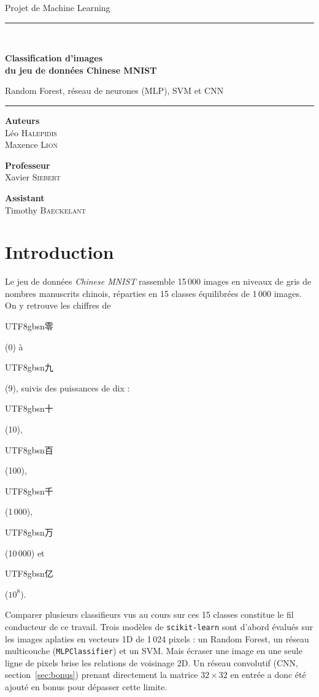 \documentclass[10pt,a4paper]{article}
\newcommand{\zh}[1]{\begin{CJK}{UTF8}{gbsn}#1\end{CJK}}
\begin{document}
\begin{titlepage}
\centering
\vspace*{1cm}
{\large Projet de Machine Learning\par}
\vspace{2cm}
\rule{\textwidth}{1.2pt}\\[0.6cm]
{\Huge\bfseries Classification d'images \\[0.3cm] du jeu de données Chinese MNIST\par}
\vspace{0.4cm}
{\Large Random Forest, réseau de neurones (MLP), SVM et CNN\par}
\rule{\textwidth}{1.2pt}
\vspace{2.5cm}

{\large\textbf{Auteurs}\\[0.3cm]
Léo \textsc{Halepidis}\\
Maxence \textsc{Lion}\par}
\vspace{1.5cm}

{\large\textbf{Professeur}\\[0.3cm]
Xavier \textsc{Siebert}\par}
\vspace{0.8cm}

{\large\textbf{Assistant}\\[0.3cm]
Timothy \textsc{Baeckelant}\par}
\vspace{1.5cm}
\end{titlepage}

\tableofcontents
\clearpage
{}

\section{Introduction}

Le jeu de données \emph{Chinese MNIST} rassemble 15\,000 images en niveaux de gris de nombres manuscrits chinois, réparties en 15 classes équilibrées de 1\,000 images. On y retrouve les chiffres de \zh{零} (0) à \zh{九} (9), suivis des puissances de dix : \zh{十} (10), \zh{百} (100), \zh{千} (1\,000), \zh{万} (10\,000) et \zh{亿} ($10^8$).

Comparer plusieurs classifieurs vus au cours sur ces 15 classes constitue le fil conducteur de ce travail. Trois modèles de \texttt{scikit-learn} sont d'abord évalués sur les images aplaties en vecteurs 1D de 1\,024 pixels : un Random Forest, un réseau multicouche (\texttt{MLPClassifier}) et un SVM. Mais écraser une image en une seule ligne de pixels brise les relations de voisinage 2D. Un réseau convolutif (CNN, section~\ref{sec:bonus}) prenant directement la matrice $32\times32$ en entrée a donc été ajouté en bonus pour dépasser cette limite.
\end{document}
